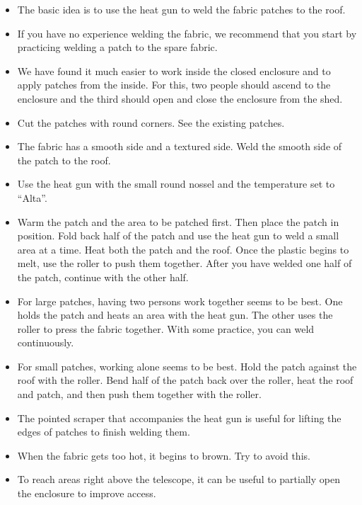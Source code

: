 \begin{itemize}

\item
The basic idea is to use the heat gun to weld the fabric patches to the roof.

\item
If you have no experience welding the fabric, we recommend that you start by practicing welding a patch to the spare fabric.

\item
We have found it much easier to work inside the closed enclosure and to apply patches from the inside. For this, two people should ascend to the enclosure and the third should open and close the enclosure from the shed.

\item
Cut the patches with round corners. See the existing patches.

\item
The fabric has a smooth side and a textured side. Weld the smooth side of the patch to the roof.

\item
Use the heat gun with the small round nossel and the temperature set to “Alta”.

\item
Warm the patch and the area to be patched first. Then place the patch in position. Fold back half of the patch and use the heat gun to weld a small area at a time. Heat both the patch and the roof. Once the plastic begins to melt, use the roller to push them together. After you have welded one half of the patch, continue with the other half.

\item
For large patches, having two persons work together seems to be best. One holds the patch and heats an area with the heat gun. The other uses the roller to press the fabric together. With some practice, you can weld continuously. 

\item
For small patches, working alone seems to be best. Hold the patch against the roof with the roller. Bend half of the patch back over the roller, heat the roof and patch, and then push them together with the roller.

\item The pointed scraper that accompanies the heat gun is useful for lifting the edges of patches to finish welding them.

\item
When the fabric gets too hot, it begins to brown. Try to avoid this.

\item
To reach areas right above the telescope, it can be useful to partially open the enclosure to improve access.

\end{itemize}


